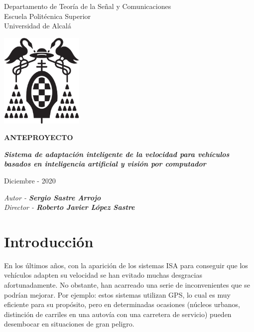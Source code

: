 \documentclass[12pt,oneside,a4paper]{article}
\begin{document}
\thispagestyle{empty}

\begin{center}


Departamento de Teoría de la Señal y Comunicaciones\\
Escuela Politécnica Superior\\
Universidad de Alcalá\\

\vspace{1cm}

\includegraphics[width=4cm]{figuras/logo-uah.eps}

\textbf{ANTEPROYECTO}

\vspace{1cm}

\begin{large}\textbf{\textit{Sistema de adaptación inteligente de la velocidad para vehículos basados en inteligencia artificial y visión por computador}}\end{large}

\vfill

Diciembre - 2020

\end{center}

\begin{flushright}
\textit{Autor - \textbf{Sergio Sastre Arrojo}} \\
\textit{Director - \textbf{Roberto Javier López Sastre}}
\end{flushright}

\newpage
\section{Introducción}

En los últimos años, con la aparición de los sistemas ISA para conseguir que los vehículos adapten su velocidad se han evitado muchas desgracias afortunadamente. No obstante, han acarreado una serie de inconvenientes que se podrían mejorar. Por ejemplo: estos sistemas utilizan GPS, lo cual es muy eficiente para su propósito, pero en determinadas ocasiones (núcleos urbanos, distinción de carriles en una autovía con una carretera de servicio) pueden desembocar en situaciones de gran peligro.
\end{document}
